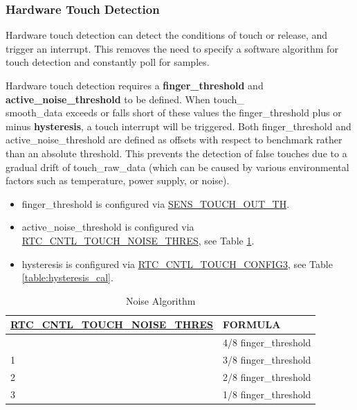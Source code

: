 \documentclass[main\_\_EN.tex]{subfiles}
\begin{document}
\subsubsection{Hardware Touch Detection}

Hardware touch detection can detect the conditions of touch or release, and trigger an interrupt. This removes the need to specify a software algorithm for touch detection and constantly poll for samples.

Hardware touch detection requires a \textbf{finger\_threshold} and \textbf{active\_noise\_threshold} to be defined. When touch\_\\smooth\_data exceeds or falls short of these values the finger\_threshold plus or minus \textbf{hysteresis}, a touch interrupt will be triggered. Both finger\_threshold and active\_noise\_threshold are defined as offsets with respect to benchmark rather than an absolute threshold. This prevents the detection of false touches due to a gradual drift of touch\_raw\_data (which can be caused by various environmental factors such as temperature, power supply, or noise).

\begin{itemize}
    \item finger\_threshold is configured via \hyperref[fielddesc:SENSTOUCHOUTTH1]{SENS\_TOUCH\_OUT\_TH}.
    \item active\_noise\_threshold is configured via \hyperref[fielddesc:RTCCNTLTOUCHNOISETHRES]{RTC\_CNTL\_TOUCH\_NOISE\_THRES}, see Table \ref{table:noise_cal}.
    \item hysteresis is configured via \hyperref[fielddesc:RTCCNTLTOUCHHYSTERESIS]{RTC\_CNTL\_TOUCH\_CONFIG3}, see Table \ref{table:hysteresis_cal}.
\end{itemize}

\begin{longtable}[c]{|p{6 cm}|p{4cm}|}
    \caption{Noise Algorithm}
    \label{table:noise_cal}\\
    \hline
    \rowcolor{lightgray}
    \textbf{\hyperref[fielddesc:RTCCNTLTOUCHNOISETHRES]{RTC\_CNTL\_TOUCH\_NOISE\_THRES}} & \textbf{FORMULA}\\
    \hline
    \endhead
    \endfoot
    \endlastfoot
    0  & 4/8 finger\_threshold \\\hline
    1  & 3/8 finger\_threshold \\\hline
    2  & 2/8 finger\_threshold \\\hline
    3  & 1/8 finger\_threshold \\\hline
\end{longtable}
\end{document}
